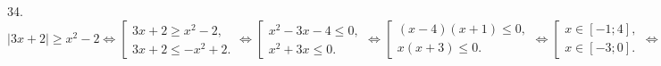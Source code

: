 34. $|3x+2|\geqslant x^2-2\Leftrightarrow\left[\begin{array}{l}3x+2\geqslant x^2-2,\\ 3x+2\leqslant -x^2+2.\end{array}\right.\Leftrightarrow
\left[\begin{array}{l}x^2-3x-4\leqslant 0,\\ x^2+3x\leqslant 0.\end{array}\right.\Leftrightarrow
\left[\begin{array}{l}(x-4)(x+1)\leqslant 0,\\ x(x+3)\leqslant 0.\end{array}\right.
\Leftrightarrow
\left[\begin{array}{l}x\in[-1;4],\\ x\in[-3;0].\end{array}\right.\Leftrightarrow
x\in[-3;4].$\\
